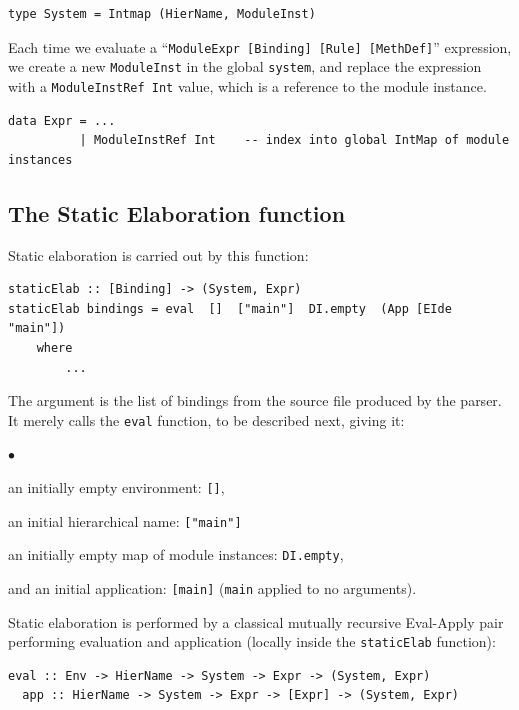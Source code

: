 \documentclass[11pt]{article}
\newenvironment{tightlist}%
{\begin{list}{$\bullet$}{%
    \setlength{\topsep}{0in}
    \setlength{\partopsep}{0in}
    \setlength{\itemsep}{0in}
    \setlength{\parsep}{0in}
    \setlength{\leftmargin}{1.5em}
    \setlength{\rightmargin}{0in}
    \setlength{\itemindent}{0in}
}
}%
{\end{list}
}
\newcommand{\term}[1]{\texttt{#1}}
\begin{document}
\begin{Verbatim}[frame=single, commandchars=\\\{\}]
type System = Intmap (HierName, ModuleInst)
\end{Verbatim}

Each time we evaluate a ``\verb|ModuleExpr [Binding] [Rule] [MethDef]|''
expression, we create a new \term{ModuleInst} in the global
\term{system}, and replace the expression with a \verb|ModuleInstRef Int|
value, which is a reference to the module instance.

\begin{Verbatim}[frame=single, commandchars=\\\{\}]
data Expr = ...
          | ModuleInstRef Int    -- index into global IntMap of module instances
\end{Verbatim}


\subsection{The Static Elaboration function}

Static elaboration is carried out by this function:

\begin{Verbatim}[frame=single, commandchars=\\\{\}]
staticElab :: [Binding] -> (System, Expr)
staticElab bindings = eval  []  ["main"]  DI.empty  (App [EIde "main"])
    where
        ...
\end{Verbatim}

The argument is the list of bindings from the source file produced by
the parser.  It merely calls the \term{eval} function, to be described
next, giving it:
\begin{tightlist}
\item an initially empty environment: \term{[]},
\item an initial hierarchical name: \term{["main"]}
\item an initially empty map of module instances: \term{DI.empty},
\item and an initial application: \term{[main]} (\term{main} applied to no arguments).
\end{tightlist}

Static elaboration is performed by a classical mutually recursive
Eval-Apply pair performing evaluation and application (locally inside
the \term{staticElab} function):

\begin{Verbatim}[frame=single, commandchars=\\\{\}]
  eval :: Env -> HierName -> System -> Expr -> (System, Expr)
  app :: HierName -> System -> Expr -> [Expr] -> (System, Expr)
\end{Verbatim}
\end{document}
